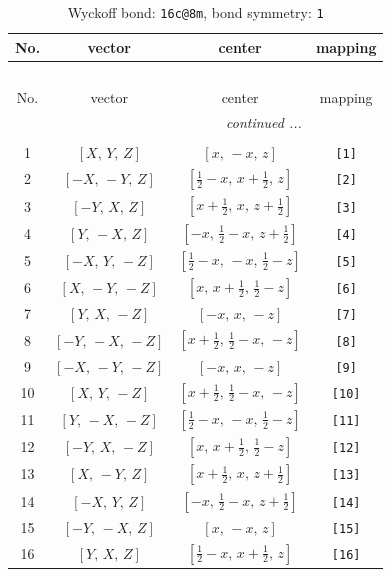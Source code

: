 \documentclass[fleqn,8pt]{jsarticle}
\begin{document}
\begin{longtable}{cccc}
\caption{Wyckoff bond: {\tt 16c@8m}, bond symmetry: {\tt 1}}
 \\
 \hline \hline
No. & vector & center & mapping \\ \hline \endfirsthead

\multicolumn{3}{l}{\tablename\ \thetable{}} \\
 \hline \hline
No. & vector & center & mapping \\ \hline \endhead

 \hline \hline
\multicolumn{3}{r}{\footnotesize\it continued ...} \\ \endfoot

 \hline \hline
\multicolumn{3}{r}{} \\ \endlastfoot

1 & $\left[ X,\, Y,\, Z \right]$ & $\left[ x,\, - x,\, z \right]$ & {\tt [1]} \\ \hline
2 & $\left[ - X,\, - Y,\, Z \right]$ & $\left[ \frac{1}{2} - x,\, x + \frac{1}{2},\, z \right]$ & {\tt [2]} \\ \hline
3 & $\left[ - Y,\, X,\, Z \right]$ & $\left[ x + \frac{1}{2},\, x,\, z + \frac{1}{2} \right]$ & {\tt [3]} \\ \hline
4 & $\left[ Y,\, - X,\, Z \right]$ & $\left[ - x,\, \frac{1}{2} - x,\, z + \frac{1}{2} \right]$ & {\tt [4]} \\ \hline
5 & $\left[ - X,\, Y,\, - Z \right]$ & $\left[ \frac{1}{2} - x,\, - x,\, \frac{1}{2} - z \right]$ & {\tt [5]} \\ \hline
6 & $\left[ X,\, - Y,\, - Z \right]$ & $\left[ x,\, x + \frac{1}{2},\, \frac{1}{2} - z \right]$ & {\tt [6]} \\ \hline
7 & $\left[ Y,\, X,\, - Z \right]$ & $\left[ - x,\, x,\, - z \right]$ & {\tt [7]} \\ \hline
8 & $\left[ - Y,\, - X,\, - Z \right]$ & $\left[ x + \frac{1}{2},\, \frac{1}{2} - x,\, - z \right]$ & {\tt [8]} \\ \hline
9 & $\left[ - X,\, - Y,\, - Z \right]$ & $\left[ - x,\, x,\, - z \right]$ & {\tt [9]} \\ \hline
10 & $\left[ X,\, Y,\, - Z \right]$ & $\left[ x + \frac{1}{2},\, \frac{1}{2} - x,\, - z \right]$ & {\tt [10]} \\ \hline
11 & $\left[ Y,\, - X,\, - Z \right]$ & $\left[ \frac{1}{2} - x,\, - x,\, \frac{1}{2} - z \right]$ & {\tt [11]} \\ \hline
12 & $\left[ - Y,\, X,\, - Z \right]$ & $\left[ x,\, x + \frac{1}{2},\, \frac{1}{2} - z \right]$ & {\tt [12]} \\ \hline
13 & $\left[ X,\, - Y,\, Z \right]$ & $\left[ x + \frac{1}{2},\, x,\, z + \frac{1}{2} \right]$ & {\tt [13]} \\ \hline
14 & $\left[ - X,\, Y,\, Z \right]$ & $\left[ - x,\, \frac{1}{2} - x,\, z + \frac{1}{2} \right]$ & {\tt [14]} \\ \hline
15 & $\left[ - Y,\, - X,\, Z \right]$ & $\left[ x,\, - x,\, z \right]$ & {\tt [15]} \\ \hline
16 & $\left[ Y,\, X,\, Z \right]$ & $\left[ \frac{1}{2} - x,\, x + \frac{1}{2},\, z \right]$ & {\tt [16]} \\
\end{longtable}
\end{document}
